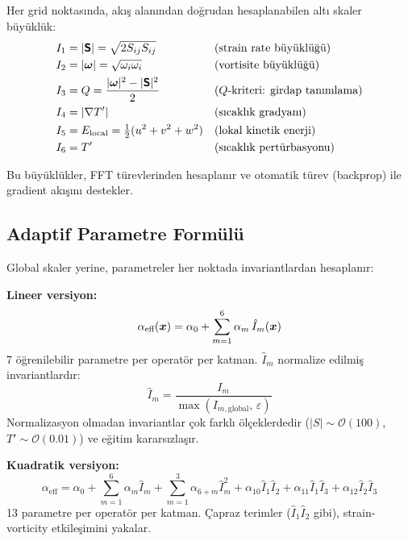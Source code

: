 Her grid noktasında, akış alanından doğrudan hesaplanabilen altı skaler büyüklük:
\begin{equation}
\begin{aligned}
    I_1 &= |\bm{\mathsf{S}}| = \sqrt{2 S_{ij} S_{ij}} && \text{(strain rate büyüklüğü)} \\
    I_2 &= |\bm{\omega}| = \sqrt{\omega_i \omega_i} && \text{(vortisite büyüklüğü)} \\
    I_3 &= Q = \frac{|\bm{\omega}|^2 - |\bm{\mathsf{S}}|^2}{2} && \text{($Q$-kriteri: girdap tanımlama)} \\
    I_4 &= |\nabla T'| && \text{(sıcaklık gradyanı)} \\
    I_5 &= E_{\text{local}} = \tfrac{1}{2}(u^2 + v^2 + w^2) && \text{(lokal kinetik enerji)} \\
    I_6 &= T' && \text{(sıcaklık pertürbasyonu)}
\end{aligned}
\label{eq:invariants}
\end{equation}

Bu büyüklükler, FFT türevlerinden hesaplanır ve otomatik türev (backprop) ile gradient akışını destekler.

\subsection{Adaptif Parametre Formülü}

Global skaler yerine, parametreler her noktada invariantlardan hesaplanır:

\textbf{Lineer versiyon:}
\begin{equation}
    \alpha_{\text{eff}}(\bm{x}) = \alpha_0 + \sum_{m=1}^{6} \alpha_m \, \hat{I}_m(\bm{x})
    \label{eq:linear_modulation}
\end{equation}
7 öğrenilebilir parametre per operatör per katman. $\hat{I}_m$ normalize edilmiş invariantlardır:
\begin{equation}
    \hat{I}_m = \frac{I_m}{\max(I_{m,\text{global}}, \, \varepsilon)}
    \label{eq:invariant_normalization}
\end{equation}
Normalizasyon olmadan invariantlar çok farklı ölçeklerdedir ($|S| \sim \mathcal{O}(100)$, $T' \sim \mathcal{O}(0.01)$) ve eğitim kararsızlaşır.

\textbf{Kuadratik versiyon:}
\begin{equation}
    \alpha_{\text{eff}} = \alpha_0
    + \sum_{m=1}^{6} \alpha_m \hat{I}_m
    + \sum_{m=1}^{3} \alpha_{6+m} \hat{I}_m^2
    + \alpha_{10} \hat{I}_1 \hat{I}_2
    + \alpha_{11} \hat{I}_1 \hat{I}_3
    + \alpha_{12} \hat{I}_2 \hat{I}_3
    \label{eq:quadratic_modulation}
\end{equation}
13 parametre per operatör per katman. Çapraz terimler ($\hat{I}_1 \hat{I}_2$ gibi), strain-vorticity etkileşimini yakalar.

